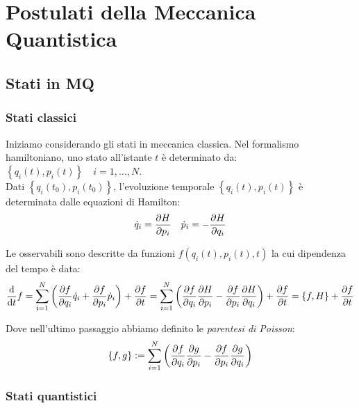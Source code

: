

\chapter{Postulati della Meccanica Quantistica}


\section{Stati in MQ}

\subsection{Stati classici}
Iniziamo considerando gli stati in meccanica classica.
Nel formalismo hamiltoniano, uno stato all'istante \(t\) 
è determinato da: \(\left\{ q_i(t), p_i(t) \right\}\quad i = 1,\dots, N\).\\
Dati \(\left\{ q_i(t_0),p_i(t_0) \right\}\), l'evoluzione temporale \(\left\{ q_i(t), p_i(t)\right\}\) è determinata dalle equazioni di Hamilton:
\begin{equation}
    \dot{q}_i= \pdv{H}{p_i } \quad \dot{p}_i = -\pdv{H}{q_i }
\end{equation}

Le osservabili sono descritte da funzioni \(f(q_i(t),p_i(t),t)\) la cui dipendenza del tempo è data:
\[
\dv{t} f = \sum_{i=1}^{N} \left( \pdv{f}{q_i}\dot{q}_i+ \pdv{f}{p_i}\dot{p}_i  \right)  +\pdv{f}{t}
= \sum_{i=1}^{N} \left( \pdv{f}{q_i}\pdv{H}{p_i}-\pdv{f}{p_i}\pdv{H}{q_i} \right)+\pdv{f}{t}
= \left\{ f, H \right\} +\pdv{f}{t}
\]

Dove nell'ultimo passaggio abbiamo definito le \textit{parentesi di Poisson}:
\begin{equation}
    \left\{ f,g \right\}:= \sum_{i=1}^{N}\left( \pdv{f}{q_i}\pdv{g}{p_i}-\pdv{f}{p_i}\pdv{g}{q_i} \right)    
\end{equation}


\subsection{Stati quantistici}

